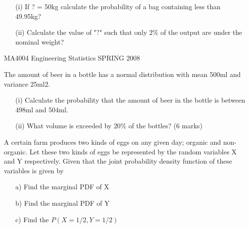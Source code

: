 \documentclass[12pt]{report}
\begin{document}
\begin{itemize}
	\item[(i)] If ? = 50kg calculate the probability of a bag containing less than
49.95kg?
	\item[(ii)] Calculate the value of "?" such that only $2\%$ of the output are under the
nominal weight?
\end{itemize}

MA4004     Engineering Statistics    SPRING 2008


The amount of beer in a bottle has a normal distribution with mean 500ml and variance 25ml2.
\begin{itemize}
\item[(i)]	Calculate the probability that the amount of beer in the bottle is between 498ml and 504ml.
\item[(ii)]	What volume is exceeded by $20\%$ of the bottles?
(6 marks)
\end{itemize}

	
	
	
	A certain farm produces two kinds of eggs on any given day; organic and non-organic. 
	Let these two kinds of eggs be represented by the random variables X and Y respectively. 
	Given that the joint probability density function of these variables is given by
	
	
	\begin{itemize}
		\item[a)] Find the marginal PDF of X
		
		\item[b)] Find the marginal PDF of Y
		
		\item[c)] Find the $P(X = 1/2, Y = 1/2)$
	\end{itemize}


%	
%		
\end{document}
